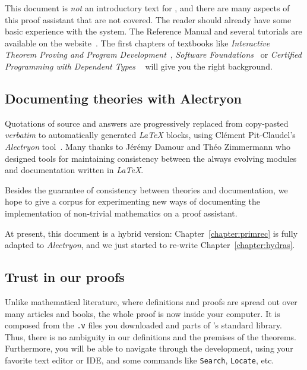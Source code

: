 \documentclass[a4paper]{book}
\begin{document}
This document is \emph{not} an introductory text for \coq{}, and there are many aspects of this proof assistant that are not covered. 
 The reader should already have some basic experience with the \coq{} system. The Reference Manual and several tutorials are available on the \coq{} website~\cite{Coq}. The first chapters of textbooks like \emph{Interactive Theorem Proving and Program Development}~\cite{BC04}, \emph{Software Foundations}~\cite{SF} or  \emph{Certified Programming with Dependent Types} ~\cite{chlipalacpdt2011} will give you the right background.


 
\subsection{Documenting theories with Alectryon}

Quotations of \coq{} source and answers are progressively replaced from copy-pasted \emph{verbatim} to automatically generated \emph{LaTeX} blocks, using Clément Pit-Claudel's \emph{Alectryon} tool~\cite{alectryonpaper, alectryongithub}.
Many thanks to Jérémy Damour and Théo Zimmermann who designed tools for maintaining consistency between the always evolving \coq{} modules and documentation written in \emph{LaTeX}.

Besides the guarantee of consistency between theories and documentation, we hope to give a corpus for experimenting new ways of documenting the implementation of non-trivial mathematics on a proof assistant.


At present, this document is a hybrid version: Chapter~\vref{chapter:primrec} is fully adapted to \emph{Alectryon}, and we just started to re-write Chapter~\vref{chapter:hydras}.




\subsection{Trust in our proofs}
\label{sect:trust-in-proofs}

Unlike mathematical literature, where definitions and proofs are spread out over many articles and books,
the whole proof is now inside your computer. It is composed from the \texttt{.v} files you downloaded and
parts of \coq's standard library. Thus, there is no ambiguity in our definitions and the premises of the theorems. Furthermore, you will be able to navigate through the development, using your favorite text editor or IDE, and some commands like \texttt{Search}, \texttt{Locate},  etc.
\end{document}
